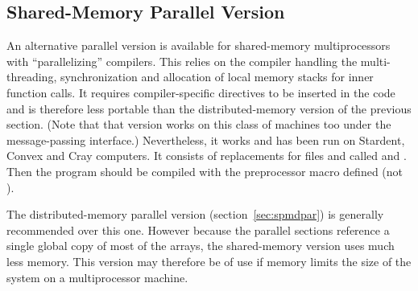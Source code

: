 \documentclass[a4paper,twoside]{report}
\begin{document}
\subsection{Shared-Memory Parallel Version}
\label{sec:shmpar}
An alternative parallel version is available for shared-memory
multiprocessors with ``parallelizing'' compilers.  This relies on the
compiler handling the multi-threading, synchronization and allocation
of local memory stacks for inner function calls. It requires
compiler-specific directives to be inserted in the code and is
therefore less portable than the distributed-memory version of the
previous section. (Note that that version works on this class of
machines too under the message-passing interface.) Nevertheless, it
works and has been run on Stardent, Convex and Cray computers.  It
consists of replacements for files  and
 called  and
. Then the program should be compiled with
the preprocessor macro  defined (not ).

The distributed-memory parallel version (section~\ref{sec:spmdpar}) is
generally recommended over this one.  However because the parallel
sections reference a single global copy of most of the arrays, the
shared-memory version uses much less memory.  This version may
therefore be of use if memory limits the size of the system on 
a multiprocessor machine.
\end{document}
